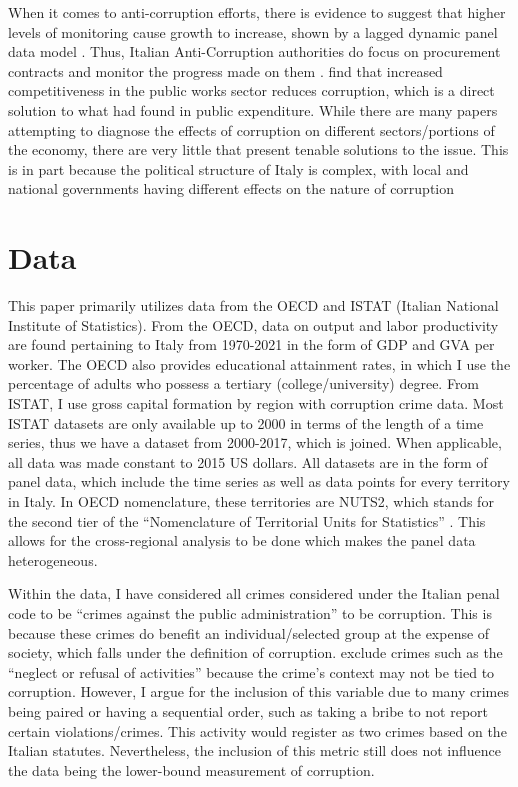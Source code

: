 \documentclass[12pt]{article} %
\begin{document}
When it comes to anti-corruption efforts, there is evidence to suggest that higher levels of monitoring cause growth to increase, shown by a lagged dynamic panel data model \citep{coppier_role_2013}. Thus, Italian Anti-Corruption authorities do focus on procurement contracts and monitor the progress made on them \citep{anac_anac_2023}. \citet{finocchiaro_castro_is_2018} find that increased competitiveness in the public works sector reduces corruption, which is a direct solution to what \citet{del_monte_public_2001} had found in public expenditure. While there are many papers attempting to diagnose the effects of corruption on different sectors/portions of the economy, there are very little that present tenable solutions to the issue. This is in part because the political structure of Italy is complex, with local and national governments having different effects on the nature of corruption 




\section*{Data}
This paper primarily utilizes data from the OECD and ISTAT (Italian National Institute of Statistics). From the OECD, data on output and labor productivity are found pertaining to Italy from 1970-2021 in the form of GDP and GVA per worker. The OECD also provides educational attainment rates, in which I use the percentage of adults who possess a tertiary (college/university) degree. From ISTAT, I use gross capital formation by region with corruption crime data. Most ISTAT datasets are only available up to 2000 in terms of the length of a time series, thus we have a dataset from 2000-2017, which is joined. When applicable, all data was made constant to 2015 US dollars. All datasets are in the form of panel data, which include the time series as well as data points for every territory in Italy. In OECD nomenclature, these territories are NUTS2, which stands for the second tier of the “Nomenclature of Territorial Units for Statistics” \citep{oecd_classifying_2019}. This allows for the cross-regional analysis to be done which makes the panel data heterogeneous. 

Within the data, I have considered all crimes considered under the Italian penal code to be “crimes against the public administration” to be corruption. This is because these crimes do benefit an individual/selected group at the expense of society, which falls under the definition of corruption. \citet{del_monte_public_2001} exclude crimes such as the “neglect or refusal of activities” because the crime’s context may not be tied to corruption. However, I argue for the inclusion of this variable due to many crimes being paired or having a sequential order, such as taking a bribe to not report certain violations/crimes. This activity would register as two crimes based on the Italian statutes. Nevertheless, the inclusion of this metric still does not influence the data being the lower-bound measurement of corruption.
\end{document}

